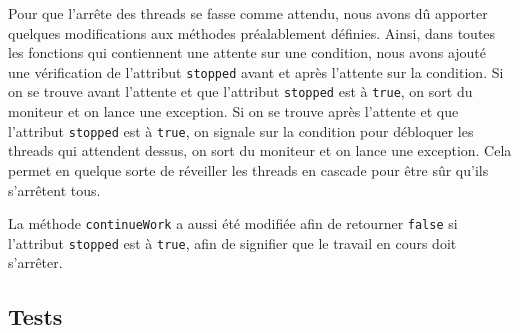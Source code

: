 \documentclass{article}
\begin{document}
Pour que l'arrête des threads se fasse comme attendu, nous avons dû apporter quelques modifications aux méthodes
préalablement définies. Ainsi, dans toutes les fonctions qui contiennent une attente sur une condition, nous avons
ajouté une vérification de l'attribut \texttt{stopped} avant et après l'attente sur la condition. Si on se trouve
avant l'attente et que l'attribut \texttt{stopped} est à \texttt{true}, on sort du moniteur et on lance
une exception. Si on se trouve après l'attente et que l'attribut \texttt{stopped} est à \texttt{true}, on signale sur
la condition pour débloquer les threads qui attendent dessus, on sort du moniteur et on lance une exception. Cela
permet en quelque sorte de réveiller les threads en cascade pour être sûr qu'ils s'arrêtent tous.

La méthode \texttt{continueWork} a aussi été modifiée afin de retourner \texttt{false} si l'attribut \texttt{stopped} est
à \texttt{true}, afin de signifier que le travail en cours doit s'arrêter.

\subsection{Tests}
\end{document}

